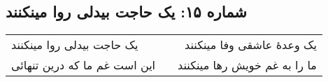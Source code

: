 \begin{center}
\section*{شماره ۱۵: یک حاجت بیدلی روا مینکنند}
\label{sec:015}
\begin{longtable}{l p{0.5cm} r}
یک حاجت بیدلی روا مینکنند
&&
یک وعدهٔ عاشقی وفا مینکنند
\\
این است غم ما که درین تنهائی
&&
ما را به غم خویش رها مینکنند
\\
\end{longtable}
\end{center}
